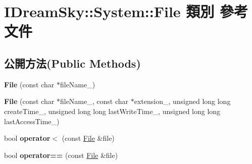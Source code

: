 \hypertarget{class_i_dream_sky_1_1_system_1_1_file}{}\section{I\+Dream\+Sky\+:\+:System\+:\+:File 類別 參考文件}
\label{class_i_dream_sky_1_1_system_1_1_file}
\subsection*{公開方法(Public Methods)}
\begin{DoxyCompactItemize}
\item 
{\bfseries File} (const char $\ast$file\+Name\+\_\+)\hypertarget{class_i_dream_sky_1_1_system_1_1_file_ad97494dab19519003b0f61cc7096a35c}{}\label{class_i_dream_sky_1_1_system_1_1_file_ad97494dab19519003b0f61cc7096a35c}

\item 
{\bfseries File} (const char $\ast$file\+Name\+\_\+, const char $\ast$extension\+\_\+, unsigned long long create\+Time\+\_\+, unsigned long long last\+Write\+Time\+\_\+, unsigned long long last\+Access\+Time\+\_\+)\hypertarget{class_i_dream_sky_1_1_system_1_1_file_ac93b16f787e0a1c3eda7ca9f2b9ae561}{}\label{class_i_dream_sky_1_1_system_1_1_file_ac93b16f787e0a1c3eda7ca9f2b9ae561}

\item 
bool {\bfseries operator$<$} (const \hyperlink{class_i_dream_sky_1_1_system_1_1_file}{File} \&file)\hypertarget{class_i_dream_sky_1_1_system_1_1_file_a203312f63dc4a918847350247897ae9d}{}\label{class_i_dream_sky_1_1_system_1_1_file_a203312f63dc4a918847350247897ae9d}

\item 
bool {\bfseries operator==} (const \hyperlink{class_i_dream_sky_1_1_system_1_1_file}{File} \&file)\hypertarget{class_i_dream_sky_1_1_system_1_1_file_abfa34add01236a7d99387bc7940dbd0f}{}\label{class_i_dream_sky_1_1_system_1_1_file_abfa34add01236a7d99387bc7940dbd0f}

\end{DoxyCompactItemize}
